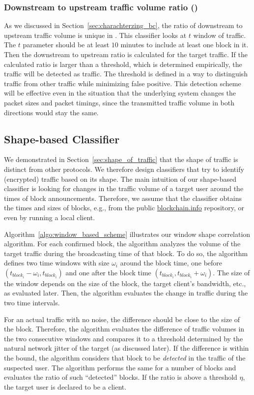 \subsubsection{Downstream to upstream traffic volume ratio ()}
As we discussed in Section~\ref{sec:charachterzing_bc}, the ratio of downstream to upstream traffic volume is unique in \bc. This classifier looks at $t$ window of \bc traffic. The $t$ parameter should be at least $10$ minutes to include at least one block in it.
Then the downstream to upstream ratio is calculated for the target traffic. If the calculated ratio is larger than a threshold, which is determined empirically, the traffic will be detected as \bc traffic. The threshold is defined in a way to distinguish \bc traffic from other traffic while minimizing false positive. This detection scheme will be effective even in the situation that the underlying system changes the packet sizes and packet timings, since the transmitted traffic volume in both directions would stay the same.

\subsection{Shape-based Classifier}\label{window-sec}

We demonstrated in Section~\ref{sec:shape_of_traffic} that the shape of \bc traffic is distinct from other protocols. 
We therefore design classifiers that try to identify (encrypted) \bc traffic based on its shape. 
The main intuition of our shape-based classifier is looking for changes in the traffic volume of a target user around the times of block announcements. Therefore, we assume that the classifier obtains the times and sizes of \bc blocks, e.g., from the public \url{blockchain.info} repository, or even by running a local \bc client.

Algorithm~\ref{algo:window_based_scheme} illustrates our window shape correlation algorithm.
For each confirmed \bc block, the algorithm analyzes the volume of the target traffic during the broadcasting time of that block. 
To do so, the algorithm 
defines two time windows with size $\omega_i$ around the block time, 
one before $(t_{block_i}-\omega_i, t_{block_i})$ and one after the block time $(t_{block_i}, t_{block_i} +\omega_i)$.
The size of the window depends on the size of the block, the target client's bandwidth, etc., as evaluated later. 
Then, the algorithm evaluates the change in traffic during the two time intervals.  

For an actual \bc traffic with no noise, the difference should be close to the size of the block. 
Therefore, the algorithm evaluates the difference of traffic volumes in the two consecutive windows and 
compares it to a threshold determined by the natural network jitter of the target (as discussed later).
If the difference is within the bound, the algorithm considers that block to be \emph{detected} in the traffic of the suspected user. The algorithm performs the same for a number of blocks and evaluates the ratio of such ``detected'' blocks. 
If the ratio is above a threshold $\eta$, the target user is declared to be a \bc client. 


